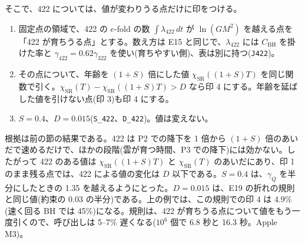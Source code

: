 そこで、422 については、値が変わりうる点だけに印をつける。
\begin{enumerate}
\item 固定点の領域で、422 の $e$-fold の数 $\int\lambda_{422}\,dt$ が $\ln(GM^2)$ を越える点を「422 が育ちうる点」とする。数え方は E15 と同じで、$\lambda_{422}$ には $C_\mathrm{BH}$ を掛けた率と $\gamma_{422}=0.62\gamma_{322}$ を使い(育ちやすい側)、表は別に持つ(\texttt{J422})。
\item その点について、年齢を $(1+S)$ 倍にした値 $\chi_\mathrm{SR}((1+S)T)$ を同じ関数で引く。$\chi_\mathrm{SR}(T)-\chi_\mathrm{SR}((1+S)T)>D$ なら印 4 にする。年齢を延ばした値を引けない点(印 3)も印 4 にする。
\item $S=0.4$、$D=0.015$(\texttt{S\_422}、\texttt{D\_422})。値は変えない。
\end{enumerate}
根拠は前の節の結果である。422 は P2 での降下を 1 倍から $(1+S)$ 倍のあいだで速めるだけで、ほかの段階(雲が育つ時間、P3 での降下)には効かない。したがって 422 のある値は $\chi_\mathrm{SR}((1+S)T)$ と $\chi_\mathrm{SR}(T)$ のあいだにあり、印 1 のまま残る点では、422 による値の変化は $D$ 以下である。$S=0.4$ は、$\gamma_Q$ を半分にしたときの 1.35 を越えるようにとった。$D=0.015$ は、E19 の折れの規則と同じ値(約束の 0.03 の半分)である。上の例では、この規則での印 4 は 4.9\%(速く回る BH では 45\%)になる。規則は、422 が育ちうる点について値をもう一度引くので、呼び出しは 5--7\% 遅くなる($10^6$ 個で 6.8 秒と 16.3 秒。Apple M3)。

